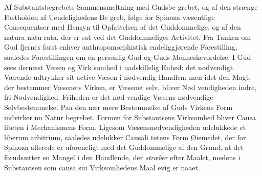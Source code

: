 \documentclass[12pt,a4paper]{book}
\begin{document}
Af Substantsbegrebets Sammensmeltning med Gudsbe\-%
grebet, og af den strænge Fastholden af Uendelighedens Be\-%
greb, følge for Spinoza væsentlige Consequentser med Hensyn
til Opfattelsen af det Guddommelige, og af den natura natu\-%
rata, der er sat ved det Guddommeliges Activitet. Fra Tanken
om Gud fjernes først enhver anthropomorphistisk endeliggjørende
Forestilling, saaledes Forestillingen om en personlig Gud og
Guds Menneskevordelse. I Gud sees dernæst Væsen og Virk\-%
somhed i uadskillelig Enhed: det nødvendigt Værende udtrykker
sit active Væsen i nødvendig Handlen; men idet den Magt,
der bestemmer Væsenets Virken, er Væsenet selv, bliver Nød\-%
vendigheden indre, fri Nødvendighed. Friheden er det nød\-%
vendige Væsens nødvendige Selvbestemmelse. Paa den nær\-%
mere Bestemmelse af Guds Virkens Form indvirker nu Natur\-%
begrebet. Formen for Substantsens Virksomhed bliver Causa\-%
liteten i Mechanismens Form. Ligesom Væsensnødvendigheden
udelukkede et liberum arbitrium, saaledes udelukker Causali\-%
tetens Form Øiemedet, der for Spinoza allerede er uforeneligt
med det Guddommelige af den Grund, at det forudsætter en
Mangel i den Handlende, der \emph{stræber} efter Maalet, medens
i Substantsen som causa sui Virksomhedens Maal evig er
naaet.
\end{document}
